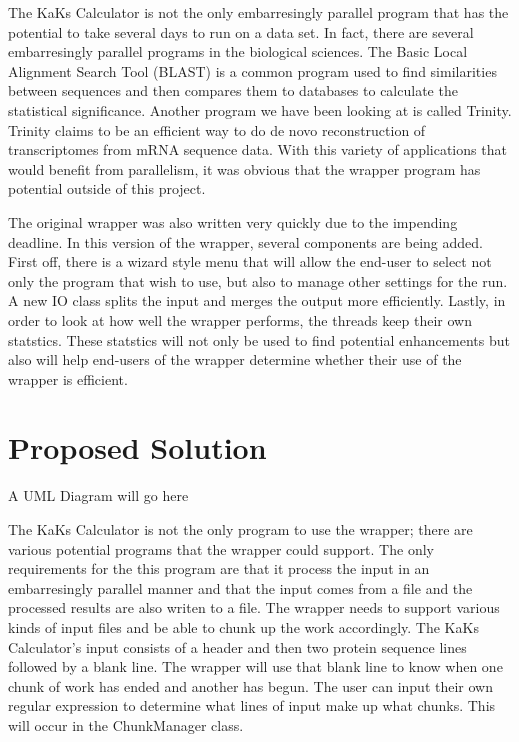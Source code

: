 \documentclass[12pt]{article}
\begin{document}
The KaKs Calculator is not the only embarresingly parallel program that has the
potential to take several days to run on a data set. In fact, there are several
embarresingly parallel programs in the biological sciences. The Basic Local
Alignment Search Tool (BLAST) \cite{BLAST} is a common program used to find
similarities between sequences and then compares them to databases to calculate
the statistical significance. Another program we have been looking at is called
Trinity. Trinity claims to be an efficient way to do de novo reconstruction of
transcriptomes from mRNA sequence data. With this variety of applications that 
would benefit from parallelism, it was obvious that the wrapper program has 
potential outside of this project.


The original wrapper was also written very quickly due to the impending
deadline. In this version of the wrapper, several components are being added.
First off, there is a wizard style menu that will allow the end-user to select
not only the program that wish to use, but also to manage other settings for the
run. A new IO class splits the input and merges the output more 
efficiently. Lastly, in order to look at how well the wrapper performs, 
the threads keep their own statstics. These statstics will not only be used to 
find potential enhancements but also will help end-users of the wrapper
determine whether their use of the wrapper is efficient.

\section{Proposed Solution}

A UML Diagram will go here

The KaKs Calculator is not the only program to use the wrapper; there are
various potential programs that the wrapper could support. The only requirements
for the this program are that it process the input in an embarresingly parallel
manner and that the input comes from a file and the processed results are also
writen to a file. The wrapper needs to support various kinds of input files and 
be able to chunk up the work accordingly. The KaKs Calculator's input consists 
of a header and then two protein sequence lines followed by a blank line. The 
wrapper will use that blank line to know when one chunk of work has ended and 
another has begun. The user can input their own regular expression to determine 
what lines of input make up what chunks. This will occur in the ChunkManager 
class. 
\end{document}
